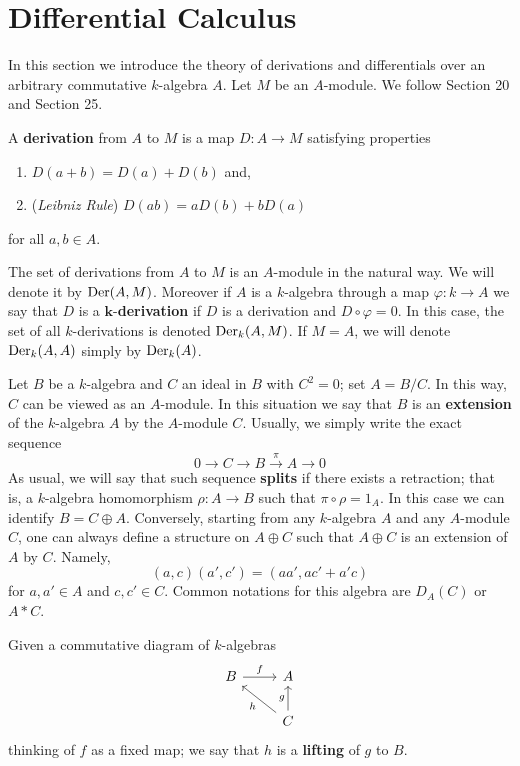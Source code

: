 \section{Differential Calculus}
In this section we introduce the theory of derivations and differentials over an arbitrary commutative $k$-algebra $A$. Let $M$ be an $A$-module. We follow \cite{EGA4} Section 20 and \cite{Matsumura} Section 25. 
\begin{definition}\label{def:derivations-and-differentials}
	A \textbf{derivation} from $A$ to $M$ is a map $D\colon A \to M$ satisfying properties
	\begin{enumerate}[label = (\roman*)]
			\item $D(a + b) = D(a) + D(b)$ and,
			\item (\textit{Leibniz Rule}) $D(ab) = aD(b) + bD(a)$ 
	\end{enumerate}
for all $a,b \in A$.

The set of derivations from $A$ to $M$ is an $A$-module in the natural way. We will denote it by $\operatorname{Der}(A,M)$. Moreover if $A$ is a $k$-algebra through a map $\varphi\colon k \to A$ we say that $D$ is a $\mathbf{k}$-\textbf{derivation} if $D$ is a derivation and $D \circ \varphi = 0$. In this case, the set of all $k$-derivations is denoted $\operatorname{Der}_{k}(A,M)$. If $M = A$, we will denote $\operatorname{Der}_{k}(A,A)$ simply by $\operatorname{Der}_{k}(A)$.
\end{definition}
\begin{definition}\label{def:extension-of-algebras}
Let $B$ be a $k$-algebra and $C$ an ideal in $B$ with $C^{2} = 0$; set $A =B/C$. In this way, $C$ can be viewed as an $A$-module. In this situation we say that $B$ is an \textbf{extension} of the $k$-algebra $A$ by the $A$-module $C$. Usually, we simply write the exact sequence
\[\label{eqn:extension}
	0 \to C \to B \xrightarrow{\pi} A \to 0
\]
As usual, we will say that such sequence \textbf{splits} if there exists a retraction; that is, a $k$-algebra homomorphism $\rho\colon A \to B$ such that $\pi \circ \rho = 1_{A}$. In this case we can identify $B = C\oplus A$. Conversely, starting from any $k$-algebra $A$ and any $A$-module $C$, one can always define a structure on $A \oplus C$ such that $A\oplus C$ is an extension of $A$ by $C$. Namely, 
\[
			(a,c)(a',c') = (aa',ac' + a'c)
\]
for $a,a'\in A$ and $c,c' \in C$. Common notations for this algebra are $D_{A}(C)$ or $A * C$.		
\end{definition}
\begin{definition}\label{def:lifting}
Given a commutative diagram of $k$-algebras
\[
	\begin{tikzcd}
		 	B \arrow[r, "f"] & A \\
		 	& C\arrow[lu, "h"] \arrow[u, "g"]
	\end{tikzcd} 
\]
thinking of $f$ as a fixed map; we say that $h$ is a \textbf{lifting} of $g$ to $B$. 
\end{definition}

